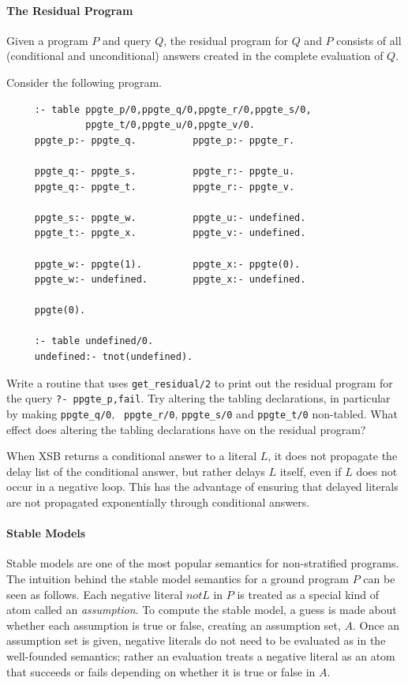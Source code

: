 \paragraph*{The Residual Program}

Given a program $P$ and query $Q$, the residual program for $Q$ and
$P$ consists of all (conditional and unconditional) answers created in
the complete evaluation of $Q$\@.  

\begin{exercise} \label{ex:pos-delay}
Consider the following program.
\begin{verbatim}
     :- table ppgte_p/0,ppgte_q/0,ppgte_r/0,ppgte_s/0,
              ppgte_t/0,ppgte_u/0,ppgte_v/0.
     ppgte_p:- ppgte_q.          ppgte_p:- ppgte_r.

     ppgte_q:- ppgte_s.          ppgte_r:- ppgte_u.
     ppgte_q:- ppgte_t.          ppgte_r:- ppgte_v.

     ppgte_s:- ppgte_w.          ppgte_u:- undefined.
     ppgte_t:- ppgte_x.          ppgte_v:- undefined.

     ppgte_w:- ppgte(1).         ppgte_x:- ppgte(0).
     ppgte_w:- undefined.        ppgte_x:- undefined.

     ppgte(0).

     :- table undefined/0.
     undefined:- tnot(undefined).
\end{verbatim}
Write a routine that uses {\tt get\_residual/2} to print out the
residual program for the query {\tt ?- ppgte\_p,fail}.  Try altering the
tabling declarations, in particular by making {\tt ppgte\_q/0}, {\tt
ppgte\_r/0}, {\tt ppgte\_s/0} and {\tt ppgte\_t/0} non-tabled.  What
effect does altering the tabling declarations have on the residual
program?
\end{exercise}

When XSB returns a conditional answer to a literal $L$, it does not
propagate the delay list of the conditional answer, but rather delays
$L$ itself, even if $L$ does not occur in a negative loop.  This has
the advantage of ensuring that delayed literals are not propagated
exponentially through conditional answers.

\paragraph*{Stable Models}

Stable models are one of the most popular semantics for non-stratified
programs.  The intuition behind the stable model semantics for a
ground program $P$ can be seen as follows.  Each negative literal $not
L$ in $P$ is treated as a special kind of atom called an {\em
assumption}.  To compute the stable model, a guess is made about
whether each assumption is true or false, creating an assumption set,
$A$\@.  Once an assumption set is given, negative literals do not need
to be evaluated as in the well-founded semantics; rather an evaluation
treats a negative literal as an atom that succeeds or fails depending
on whether it is true or false in $A$\@.


